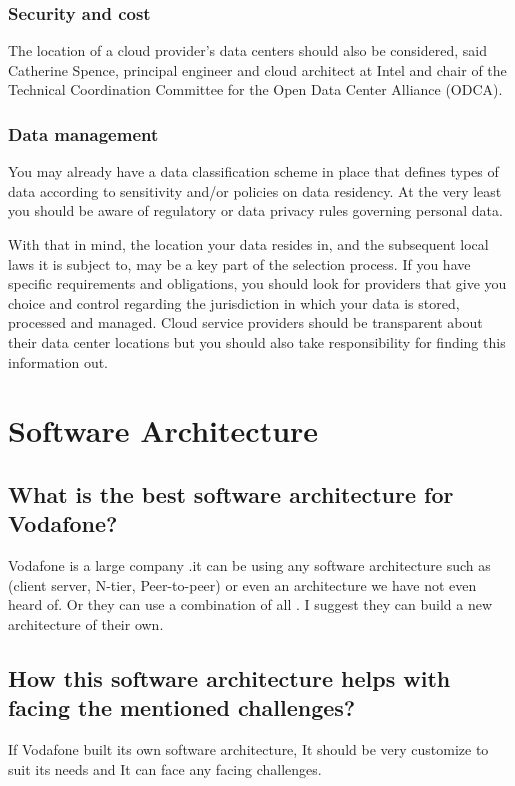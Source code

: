 \documentclass{book}
\begin{document}
\subsection{Security and cost}
The location of a cloud provider's data centers should also be considered, said Catherine Spence, principal engineer and cloud architect at Intel and chair of the Technical Coordination Committee for the Open Data Center Alliance (ODCA).

\subsection{Data management}
You may already have a data classification scheme in place that defines types of data according to sensitivity and/or policies on data residency. At the very least you should be aware of regulatory or data privacy rules governing personal data.

With that in mind, the location your data resides in, and the subsequent local laws it is subject to, may be a key part of the selection process. If you have specific requirements and obligations, you should look for providers that give you choice and control regarding the jurisdiction in which your data is stored, processed and managed. Cloud service providers should be transparent about their data center locations but you should also take responsibility for finding this information out.  
\chapter{Software Architecture}
\section{What is the best software architecture for Vodafone?}
Vodafone is a large company .it can be using any software architecture such as (client server, N-tier, Peer-to-peer) or even an architecture we have not even heard of. Or they can use a combination of all .
I suggest they can build a new architecture of their own.

\section{How this software architecture helps with facing the mentioned challenges?}

If Vodafone built its own software architecture, It should be very customize to suit its needs and It can face any facing challenges. 	
\end{document}
